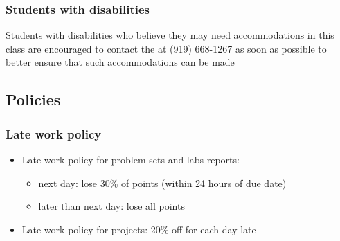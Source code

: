 \documentclass[slidestop,compress,mathserif,12pt,t,professionalfonts,xcolor=table]{beamer}
\begin{document}
\begin{frame}
\frametitle{Students with disabilities}

Students with disabilities who believe they may need accommodations in this class are encouraged to contact the  at (919) 668-1267 as soon as possible to better ensure that such accommodations can be made

\vfill



\end{frame}


\subsection{Policies}


\begin{frame}
\frametitle{Late work policy}

\begin{itemize}

\item Late work policy for problem sets and labs reports:
\begin{itemize}
\item next day: lose 30\% of points (within 24 hours of due date)
\item later than next day: lose all points
\end{itemize}

\item Late work policy for projects: 20\% off for each day late

\end{itemize}

\end{frame}

\end{document}
